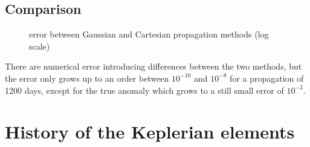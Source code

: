 \documentclass[11pt,a4paper]{report}
\begin{document}
\subsection{Comparison}
\par
\begin{figure}[H]
\centering
{}
    \caption{error between Gaussian and Cartesian propagation methods (log scale)}
\end{figure}

\par
There are numerical error introducing differences between the two methods, but the error only grows up to an order between $10^{-10}$ and $10^{-8}$ for a propagation of 1200 days, except for the true anomaly which grows to a still small error of $10^{-3}$.


\section{History of the Keplerian elements}
\end{document}
